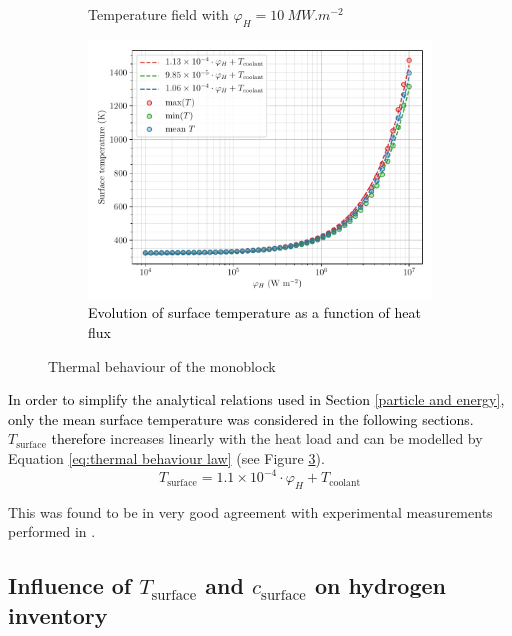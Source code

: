\begin{figure} [h!]
\begin{subfigure}{0.4\linewidth}
        \caption{Temperature field with $\varphi_H = \SI{10}{MW.m^{-2}}$}
        \label{fig:T field 10 MW}
    \end{subfigure}
    \begin{subfigure}{0.7\linewidth}
        \centering
        \includegraphics[width=\linewidth]{Figures/Chapter3/monoblocks/parametric_study/temperature_phi_H.pdf}
        \caption{\textcolor{black}{Evolution of surface temperature as a function of heat flux}}
        \label{fig:T phi_H}
    \end{subfigure}
    \caption{Thermal behaviour of the monoblock}
\end{figure}

\textcolor{black}{
In order to simplify the analytical relations used in Section \ref{particle and energy}, only the mean surface temperature was considered in the following sections.
}
$T_\mathrm{surface}$ \textcolor{black}{therefore} increases linearly with the heat load and can be modelled by Equation \ref{eq:thermal behaviour law} (see Figure \ref{fig:T phi_H}).
\begin{equation}
    T_\mathrm{surface} = 1.1 \times 10^{-4} \cdot \varphi_H + T_\mathrm{coolant}
    \label{eq:thermal behaviour law}
\end{equation}

This was found to be in very good agreement with experimental measurements performed in .

\subsection{Influence of \texorpdfstring{$T_\mathrm{surface}$}{Tsurface} and \texorpdfstring{$c_\mathrm{surface}$}{csurface} on hydrogen inventory}

